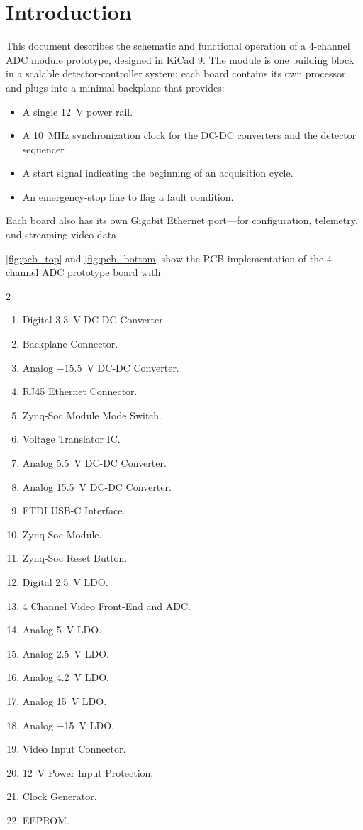 \section{Introduction}
\label{sec:intro}

This document describes the schematic and functional operation of a 4-channel ADC module prototype, designed in KiCad 9. The module is one building block in a scalable detector-controller system: each board contains its own processor and plugs into a minimal backplane that provides:
\begin{itemize}
  \item A single \SI{12}{\volt} power rail.
  \item A \SI{10}{\mega\hertz} synchronization clock for the DC-DC converters and the detector sequencer
  \item A start signal indicating the beginning of an acquisition cycle.
  \item An emergency-stop line to flag a fault condition.
\end{itemize}
Each board also has its own Gigabit Ethernet port—for configuration, telemetry, and streaming video data

\autoref{fig:pcb_top} and \autoref{fig:pcb_bottom} show the PCB implementation of the 4-channel ADC prototype board with

\begin{multicols}{2}
  \begin{enumerate}
    \item Digital \SI{3.3}{\volt} DC-DC Converter.
    \item Backplane Connector.
    \item Analog \SI{-15.5}{\volt} DC-DC Converter.
    \item RJ45 Ethernet Connector.
    \item Zynq-Soc Module Mode Switch.
    \item Voltage Translator IC.
    \item Analog \SI{5.5}{\volt} DC-DC Converter.
    \item Analog \SI{15.5}{\volt} DC-DC Converter.
    \item FTDI USB-C Interface.
    \item Zynq-Soc Module.
    \item Zynq-Soc Reset Button.
    \item Digital \SI{2.5}{\volt} LDO.
    \item 4 Channel Video Front-End and ADC.
    \item Analog \SI{5}{\volt} LDO.
    \item Analog \SI{2.5}{\volt} LDO.
    \item Analog \SI{4.2}{\volt} LDO.
    \item Analog \SI{15}{\volt} LDO.
    \item Analog \SI{-15}{\volt} LDO.
    \item Video Input Connector.
    \item \SI{12}{\volt} Power Input Protection.
    \item Clock Generator.
    \item EEPROM.
  \end{enumerate}
\end{multicols}

